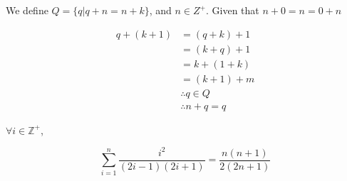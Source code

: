\documentclass[12pt]{scrartcl}
\begin{document}
\maketitle

\problem{}
We define $Q = \{q | q + n = n + k \}$, and $n \in Z^+$. Given that $n + 0 = n = 0 + n$

\begin{align*}
    q + (k + 1) &= (q + k) + 1 \\
                &= (k + q) + 1 \\
                &= k + (1 + k) \\
                &= (k + 1) + m \\
                &\therefore q \in Q \\
                &\therefore n + q = q
\end{align*}

\problem{}
\begin{theorem}
    $\forall i \in \mathbb{Z}^+$,

    \begin{equation}\label{eq:1}
        \sum_{i = 1} ^{n} \frac{i^2}{(2i -1)(2i + 1)} = \frac{n(n + 1)}{2(2n + 1)}
    \end{equation}
\end{theorem}
\end{document}
